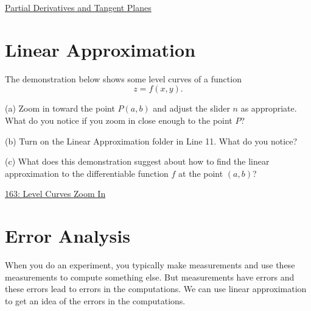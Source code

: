 \documentclass{ximera}
\begin{document}
\begin{exploration}  \label{Ede5fhj4665}
\href{https://www.geogebra.org/m/Hud6Hnpk}{Partial Derivatives and Tangent Planes}
\end{exploration}


\section{Linear Approximation}
The demonstration below shows some level curves of a function
\[
   z = f(x,y) .
\]

(a) Zoom in toward the point $P(a,b)$ and adjust the slider $n$ as appropriate. What do you notice if you zoom in close enough to the point $P$?

(b) Turn on the Linear Approximation folder in Line 11. What do you notice?

(c) What does this demonstration suggest about how to find the linear approximation to the differentiable function $f$ at the point $(a,b)$?

\begin{exploration}   \label{Edsfg907}
 
\begin{onlineOnly}
    \begin{center}
\end{center}
\end{onlineOnly}
\end{exploration}

\href{https://www.desmos.com/calculator/8hphbdetoj}{163: Level Curves Zoom In}


\section{Error Analysis}
When you do an experiment, you typically make measurements and use these measurements to compute something else. But measurements have errors and these errors lead to errors in the computations. We can use linear approximation to get an idea of the errors in the computations.
\end{document}
